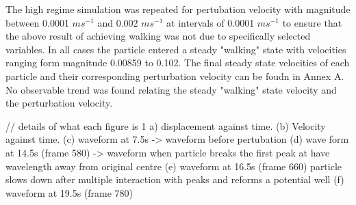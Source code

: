The high regime simulation was repeated for pertubation velocity with magnitude between 0.0001 $ms^{-1}$ and 0.002 $ms^{-1}$ at intervals of 0.0001 $ms^{-1}$ to ensure that the above result of achieving walking was not due to specifically selected variables. In all cases the particle entered a steady "walking" state with velocities ranging form magnitude 0.00859 to 0.102. The final steady state velocities of each particle and their corresponding perturbation velocity can be foudn in Annex A. No observable trend was found relating the steady "walking" state velocity and the perturbation velocity.

// details of what each figure is
1 a) displacement against time. (b) Velocity against time. (c) waveform at 7.5s -> waveform before pertubation (d) wave form at 14.5s (frame 580) -> waveform when particle breaks the first peak at have wavelength away from original centre (e) waveform at 16.5s (frame 660) particle slows down after multiple interaction with peaks and reforms a potential well (f) waveform at 19.5s (frame 780)




 